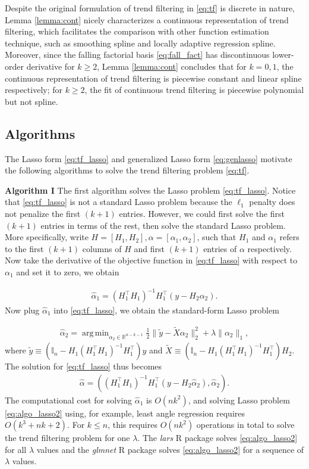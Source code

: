 \documentclass[a4paper]{article}
\DeclareMathOperator*{\argmin}{arg\,min}
\newcommand{\RR}{\mathbb{R}}
\begin{document}
Despite the original formulation of trend filtering in \eqref{eq:tf} is discrete in nature, Lemma \ref{lemma:cont} nicely characterizes a continuous representation of trend filtering, which facilitates the comparison with other function estimation technique, such as smoothing spline and locally adaptive regression spline. Moreover, since the falling factorial basis \eqref{eq:fall_fact} has discontinuous lower-order derivative for $k\geq 2$, Lemma \ref{lemma:cont} concludes that for $k = 0,1$, the continuous representation of trend filtering is piecewise constant and linear spline respectively; for $k\geq 2$, the fit of continuous trend filtering is piecewise polynomial but not spline.

\subsection{Algorithms}
\label{subsec:algo}
The Lasso form \eqref{eq:tf_lasso} and generalized Lasso form \eqref{eq:genlasso} motivate the following algorithms to solve the trend filtering problem \eqref{eq:tf}. 

\textbf{Algorithm I} The first algorithm solves the Lasso problem \eqref{eq:tf_lasso}. Notice that \eqref{eq:tf_lasso} is not a standard Lasso problem because the $\ell_1$ penalty does not penalize the first $(k+1)$ entries. However, we could first solve the first $(k+1)$ entries in terms of the rest, then solve the standard Lasso problem. More specifically, write $H = [H_1,H_2], \alpha = [\alpha_1, \alpha_2]$, such that $H_1$ and $\alpha_1$ refers to the first $(k+1)$ columns of $H$ and first $(k+1)$ entries of $\alpha$ respectively. Now take the derivative of the objective function in \eqref{eq:tf_lasso} with respect to $\alpha_1$ and set it to zero, we obtain

\begin{align*}
\hat{\alpha}_1 = (H_1^\top H_1)^{-1}H_1^\top(y-H_2\alpha_2). 
\end{align*}
Now plug $\hat{\alpha}_1$ into \eqref{eq:tf_lasso}, we obtain the standard-form Lasso problem

\begin{align}
\hat{\alpha}_2 = \argmin_{\alpha_2\in\RR^{n-k-1}} \frac{1}{2}\|\tilde{y} - \tilde{X}\alpha_2\|_2^2 + \lambda\|\alpha_2\|_1,
\label{eq:algo_lasso2}
\end{align}
where $\tilde{y} \equiv (\mathbb{I}_n - H_1(H_1^\top H_1)^{-1}H_1^\top)y$ and $\tilde{X} \equiv (\mathbb{I}_n - H_1(H_1^\top H_1)^{-1}H_1^\top)H_2$. The solution for \eqref{eq:tf_lasso} thus becomes 
\begin{align}
\hat{\alpha} = ((H_1^\top H_1)^{-1}H_1^\top(y-H_2\hat{\alpha}_2), \hat{\alpha}_2).
\end{align}
The computational cost for solving $\hat{\alpha}_1$ is $O(nk^2)$, and solving Lasso problem \eqref{eq:algo_lasso2} using, for example, least angle regression \cite{efron2004least} requires $O(k^3 + nk+2)$. For $k\leq n$, this requires $O(nk^2)$ operations in total to solve the trend filtering problem for one $\lambda$. The \textit{lars} R package solves \eqref{eq:algo_lasso2} for all $\lambda$ values and the \textit{glmnet} R package solves \eqref{eq:algo_lasso2} for a sequence of $\lambda$ values.
\end{document}
